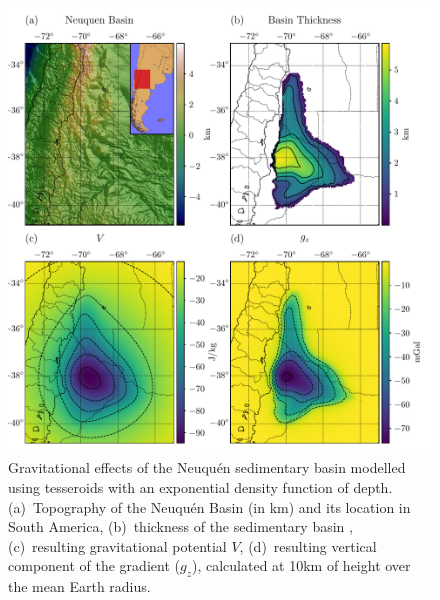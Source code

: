 \documentclass[extra, referee]{gji}
\begin{document}
\begin{figure}
\centering
\includegraphics[width=\linewidth]{figures/neuquen-basin.pdf}
\caption{
    Gravitational effects of the Neuqu\'en sedimentary basin modelled
    using tesseroids with an exponential density function of depth.
    (a)~Topography of the Neuqu\'en Basin (in km) and its location in South America,
    (b)~thickness of the sedimentary basin \citep[in meters;][]{Heine2007},
    (c)~resulting gravitational potential $V$,
    (d)~resulting vertical component of the gradient ($g_z$),
    calculated at 10km of height over the mean Earth radius.
}
\label{fig:neuquen-basin}
\end{figure}
\end{document}
